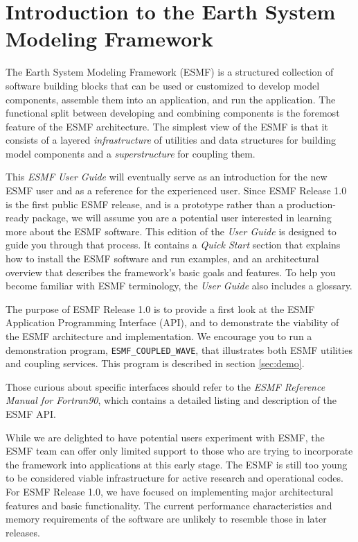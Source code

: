 \section{Introduction to the Earth System Modeling Framework}

The Earth System Modeling Framework (ESMF) is a structured collection of software 
building blocks that can be used or customized to develop model components, assemble 
them into an application, and run the application.  The functional split between developing 
and combining components is the foremost feature of the ESMF architecture.  The 
simplest view of the ESMF is that it consists of a layered {\it infrastructure} of 
utilities and data structures for building model components and a {\it superstructure} 
for coupling them.  

This {\it ESMF User Guide} will eventually serve as an introduction for the new ESMF 
user and as a reference for the experienced user.  Since ESMF Release 1.0 is the first 
public ESMF release, and is a prototype rather than a production-ready package, 
we will assume you are a 
potential user interested in learning more about the ESMF software.  This edition
of the {\it User Guide} is designed to guide you through that process.  It contains 
a {\it Quick Start} section that explains how to install the ESMF software and 
run examples, and an architectural overview that describes the framework's basic 
goals and features.  To help you become familiar with ESMF terminology, the 
{\it User Guide} also includes a glossary.

The purpose of ESMF Release 1.0 is to provide a first look at the ESMF
Application Programming Interface (API), and to demonstrate the viability 
of the ESMF architecture and implementation.  We encourage you to run a 
demonstration program, {\tt ESMF\_COUPLED\_WAVE}, that illustrates both ESMF 
utilities and coupling services.  This program is described in section \ref{sec:demo}.  

Those curious about specific interfaces should refer to the {\it ESMF Reference 
Manual for Fortran90}, which contains a detailed listing and description of 
the ESMF API.

While we are delighted to have potential users experiment with ESMF, the
ESMF team can offer only limited support to those who are trying to incorporate 
the framework into applications at this early stage.  The ESMF is still
too young to be considered viable infrastructure for active research and 
operational codes.  For ESMF Release 1.0, we have focused on implementing 
major architectural features and basic functionality.  The current performance 
characteristics and memory requirements of the software are unlikely to resemble 
those in later releases.


